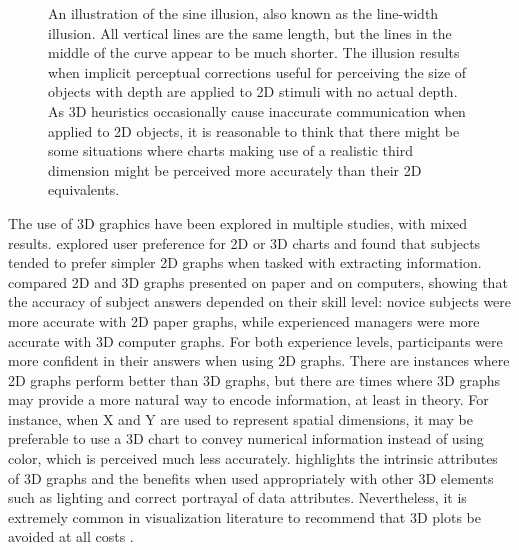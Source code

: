 \documentclass[letterpaper,inpress,dvipsnames]{jdsart}
\begin{document}
\begin{figure}
\caption{An illustration of the sine illusion\citep{vanderplasSignsSineIllusion2015}, also known as the line-width illusion. All vertical lines are the same length, but the lines in the middle of the curve appear to be much shorter. The illusion results when implicit perceptual corrections useful for perceiving the size of objects with depth are applied to 2D stimuli with no actual depth. As 3D heuristics occasionally cause inaccurate communication when applied to 2D objects, it is reasonable to think that there might be some situations where charts making use of a realistic third dimension might be perceived more accurately than their 2D equivalents.}\label{fig:sine-illusion}
\end{figure}

The use of 3D graphics have been explored in multiple studies, with mixed results.
\citet{fisher_data_1997} explored user preference for 2D or 3D charts and found that subjects tended to prefer simpler 2D graphs when tasked with extracting information.
\citet{barfield_effects_1989} compared 2D and 3D graphs presented on paper and on computers, showing that the accuracy of subject answers depended on their skill level: novice subjects were more accurate with 2D paper graphs, while experienced managers were more accurate with 3D computer graphs.
For both experience levels, participants were more confident in their answers when using 2D graphs.
There are instances where 2D graphs perform better than 3D graphs, but there are times where 3D graphs may provide a more natural way to encode information, at least in theory. For instance, when X and Y are used to represent spatial dimensions, it may be preferable to use a 3D chart to convey numerical information instead of using color, which is perceived much less accurately.
\citet{brath_3d_2014} highlights the intrinsic attributes of 3D graphs and the benefits when used appropriately with other 3D elements such as lighting and correct portrayal of data attributes.
Nevertheless, it is extremely common in visualization literature to recommend that 3D plots be avoided at all costs \citep{vanderplasTestingStatisticalCharts2020, wilkeDonGo3D2020, morganwallIntroducing3DGgplots20191006}.
\end{document}

